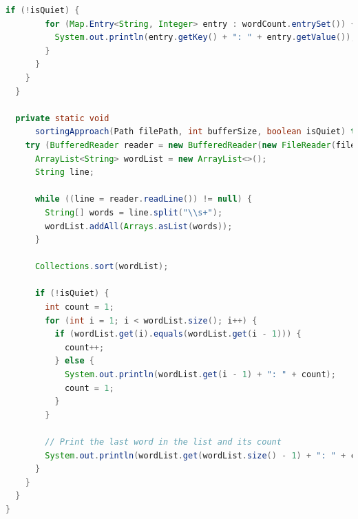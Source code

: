 \documentclass{article}
\begin{document}
\begin{lstlisting}[language=Java, 
    basicstyle=\ttfamily\scriptsize, 
    numbers=none, 
    frame=single,
    showspaces=false,
    caption={Source Code for the WordFrequencyCounter.java file.}]
      if (!isQuiet) {
        for (Map.Entry<String, Integer> entry : wordCount.entrySet()) {
          System.out.println(entry.getKey() + ": " + entry.getValue());
        }
      }
    }
  }

  private static void
      sortingApproach(Path filePath, int bufferSize, boolean isQuiet) throws IOException {
    try (BufferedReader reader = new BufferedReader(new FileReader(filePath.toFile()), bufferSize)) {
      ArrayList<String> wordList = new ArrayList<>();
      String line;

      while ((line = reader.readLine()) != null) {
        String[] words = line.split("\\s+");
        wordList.addAll(Arrays.asList(words));
      }

      Collections.sort(wordList);

      if (!isQuiet) {
        int count = 1;
        for (int i = 1; i < wordList.size(); i++) {
          if (wordList.get(i).equals(wordList.get(i - 1))) {
            count++;
          } else {
            System.out.println(wordList.get(i - 1) + ": " + count);
            count = 1;
          }
        }

        // Print the last word in the list and its count
        System.out.println(wordList.get(wordList.size() - 1) + ": " + count);
      }
    }
  }
}  
  \end{lstlisting}

  \clearpage
\end{document}
